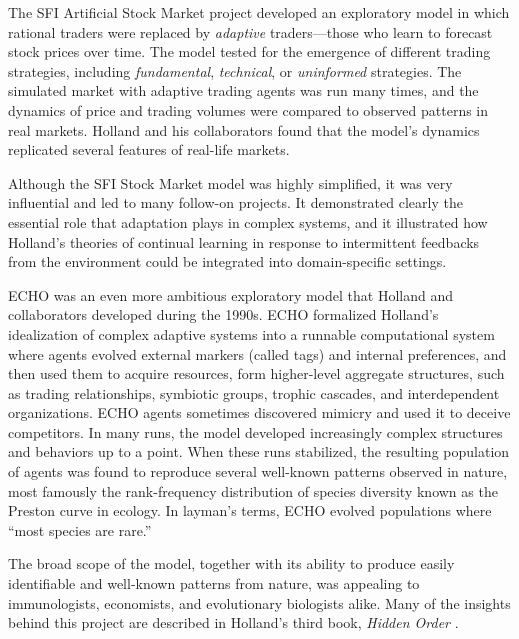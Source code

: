 \documentclass{sig-alternate}
\begin{document}
The SFI Artificial Stock Market project \cite{Arthur1997,Palmer1994}
developed an exploratory model in which rational
traders were replaced by \emph{adaptive} traders---those who learn to
forecast stock prices over time.  The model tested for the
emergence of different trading strategies, including
\emph{fundamental}, \emph{technical}, or \emph{uninformed}
strategies. The simulated market with adaptive trading agents was run
many times, and the dynamics of price and trading volumes were
compared to observed patterns in real markets.  Holland and his
collaborators found that the model's dynamics replicated several
features of real-life markets.

Although the SFI Stock Market model was highly simplified, it was very
influential and led to many follow-on projects.  It 
demonstrated clearly the essential role that adaptation plays in complex
systems, and it illustrated how Holland's theories of continual learning
in response to intermittent feedbacks from the environment could be
integrated into domain-specific settings.

ECHO \cite{Holland1999,Hraber1997} was an even more ambitious exploratory model
that Holland and collaborators developed during the 1990s. 
ECHO formalized Holland's idealization of complex adaptive systems
into a runnable computational system where agents evolved external
markers (called tags) and internal preferences, and then used them to
acquire resources, form higher-level aggregate structures, such as
trading relationships, symbiotic groups, trophic cascades, and
interdependent organizations.  ECHO agents sometimes discovered
mimicry and used it to deceive competitors.  In many runs, the model
developed increasingly complex structures and behaviors up to a point.
When these runs stabilized, the resulting population of agents was
found to reproduce several well-known patterns observed in nature,
most famously the rank-frequency distribution of species diversity
known as the Preston curve in ecology.  In layman's terms, ECHO
evolved populations where ``most species are rare.''

The broad scope of the model, together with its ability to produce
easily identifiable and well-known patterns from nature, was appealing
to immunologists, economists, and evolutionary biologists alike.  Many
of the insights behind this project are described in Holland's third
book, \emph{Hidden Order} \cite{Holland1995}.
\end{document}

